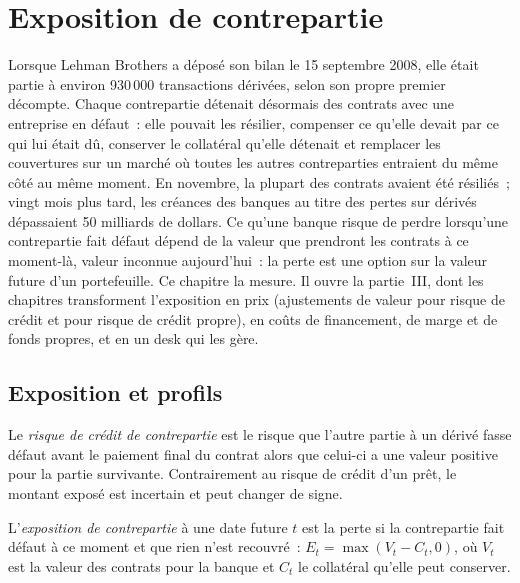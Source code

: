 \chapter{Exposition de contrepartie}\label{ch:rc:counterparty-exposure}

Lorsque Lehman Brothers a déposé son bilan le 15 septembre 2008, elle était partie à environ
930\,000 transactions dérivées, selon son propre premier décompte. Chaque contrepartie détenait
désormais des contrats avec une entreprise en défaut~: elle pouvait les résilier, compenser ce
qu'elle devait par ce qui lui était dû, conserver le collatéral qu'elle détenait et remplacer les couvertures sur un marché où toutes
les autres contreparties entraient du même côté au même moment. En novembre, la plupart
des contrats avaient été résiliés~; vingt mois plus tard, les créances des banques au titre des pertes sur dérivés
dépassaient 50 milliards de dollars. Ce qu'une banque risque de perdre lorsqu'une contrepartie fait défaut
dépend de la valeur que prendront les contrats à ce moment-là, valeur inconnue aujourd'hui~: la perte est une
option sur la valeur future d'un portefeuille. Ce chapitre la mesure. Il ouvre la partie~III, dont les
chapitres transforment l'exposition en prix (ajustements de valeur pour risque de crédit et pour risque de crédit propre), en
coûts de financement, de marge et de fonds propres, et en un desk qui les gère.

\section{Exposition et profils}

\begin{definition}\label{def:rc:counterparty-exposure:ccr}
Le \emph{risque de crédit de contrepartie} est le risque que l'autre
partie à un dérivé fasse défaut avant le paiement final du contrat alors que celui-ci a une
valeur positive pour la partie survivante. Contrairement au risque de crédit d'un prêt, le montant
exposé est incertain et peut changer de signe.
\end{definition}

\begin{definition}\label{def:rc:counterparty-exposure:exposure}
L'\emph{exposition de contrepartie} à une date future $t$ est la
perte si la contrepartie fait défaut à ce moment et que rien n'est recouvré~: $E_t = \max(V_t-C_t,0)$,
où $V_t$ est la valeur des contrats pour la banque et $C_t$ le collatéral qu'elle peut conserver.
\end{definition}


